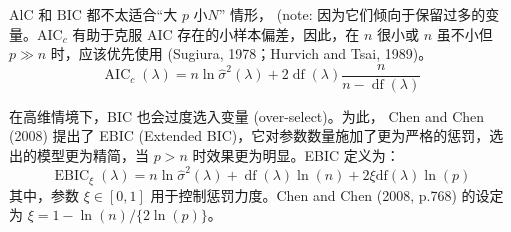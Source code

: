 $\mathrm{AlC}$ 和 $\mathrm{BIC}$ 都不太适合“大 $p$ 小$N$” 情形， (note: %
因为它们倾向于保留过多的变量。$\mathrm{AIC}_{c}$ 有助于克服 $\mathrm{AIC}$ 存在的小样本偏差，因此，在 $n$ 很小或 $n$ 虽不小但 $p\gg n$ 时，应该优先使用 (Sugiura, 1978；Hurvich and Tsai, 1989)。
\begin{equation}\label{eq:lasso-aicc}
\operatorname{AIC}_{c}(\lambda)=n \ln \widehat{\sigma}^{2}(\lambda)+2 \operatorname{df}(\lambda) \frac{n}{n-\operatorname{df}(\lambda)}
\end{equation}

在高维情境下，BIC 也会过度选入变量 (over-select)。为此，
Chen and Chen (2008) 提出了 EBIC (Extended BIC)，它对参数数量施加了更为严格的惩罚，选出的模型更为精简，当 $p>n$ 时效果更为明显。EBIC 定义为：
\begin{equation}\label{eq:lasso-ebic}
\operatorname{EBIC}_{\xi}(\lambda)=n \ln \widehat{\sigma}^{2}(\lambda)+\operatorname{df}(\lambda) \ln (n)+2 \xi \mathrm{df}(\lambda) \ln (p)
\end{equation}
其中，参数 $\xi \in[0,1]$ 用于控制惩罚力度。Chen and Chen (2008, p.768) 的设定为 $\xi=1-\ln (n) /\{2 \ln (p)\}$。


